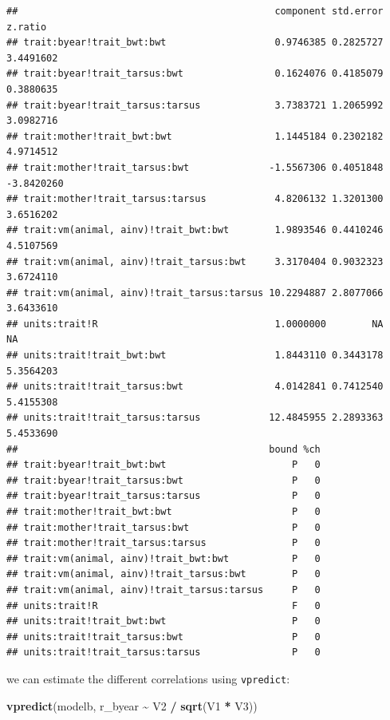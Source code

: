 \documentclass[
  12pt,
]{book}
\newenvironment{Shaded}{\begin{snugshade}}{\end{snugshade}}
\newcommand{\KeywordTok}[1]{\textcolor[rgb]{0.13,0.29,0.53}{\textbf{#1}}}
\newcommand{\NormalTok}[1]{#1}
\newcommand{\OperatorTok}[1]{\textcolor[rgb]{0.81,0.36,0.00}{\textbf{#1}}}
\newcommand{\StringTok}[1]{\textcolor[rgb]{0.31,0.60,0.02}{#1}}
\begin{document}
\begin{verbatim}
##                                             component std.error    z.ratio
## trait:byear!trait_bwt:bwt                   0.9746385 0.2825727  3.4491602
## trait:byear!trait_tarsus:bwt                0.1624076 0.4185079  0.3880635
## trait:byear!trait_tarsus:tarsus             3.7383721 1.2065992  3.0982716
## trait:mother!trait_bwt:bwt                  1.1445184 0.2302182  4.9714512
## trait:mother!trait_tarsus:bwt              -1.5567306 0.4051848 -3.8420260
## trait:mother!trait_tarsus:tarsus            4.8206132 1.3201300  3.6516202
## trait:vm(animal, ainv)!trait_bwt:bwt        1.9893546 0.4410246  4.5107569
## trait:vm(animal, ainv)!trait_tarsus:bwt     3.3170404 0.9032323  3.6724110
## trait:vm(animal, ainv)!trait_tarsus:tarsus 10.2294887 2.8077066  3.6433610
## units:trait!R                               1.0000000        NA         NA
## units:trait!trait_bwt:bwt                   1.8443110 0.3443178  5.3564203
## units:trait!trait_tarsus:bwt                4.0142841 0.7412540  5.4155308
## units:trait!trait_tarsus:tarsus            12.4845955 2.2893363  5.4533690
##                                            bound %ch
## trait:byear!trait_bwt:bwt                      P   0
## trait:byear!trait_tarsus:bwt                   P   0
## trait:byear!trait_tarsus:tarsus                P   0
## trait:mother!trait_bwt:bwt                     P   0
## trait:mother!trait_tarsus:bwt                  P   0
## trait:mother!trait_tarsus:tarsus               P   0
## trait:vm(animal, ainv)!trait_bwt:bwt           P   0
## trait:vm(animal, ainv)!trait_tarsus:bwt        P   0
## trait:vm(animal, ainv)!trait_tarsus:tarsus     P   0
## units:trait!R                                  F   0
## units:trait!trait_bwt:bwt                      P   0
## units:trait!trait_tarsus:bwt                   P   0
## units:trait!trait_tarsus:tarsus                P   0
\end{verbatim}

we can estimate the different correlations using \texttt{vpredict}:

\begin{Shaded}
\begin{Highlighting}[]
\KeywordTok{vpredict}\NormalTok{(modelb, r\_byear }\OperatorTok{\textasciitilde{}}\StringTok{ }\NormalTok{V2 }\OperatorTok{/}\StringTok{ }\KeywordTok{sqrt}\NormalTok{(V1 }\OperatorTok{*}\StringTok{ }\NormalTok{V3))}
\end{Highlighting}
\end{Shaded}
\end{document}
